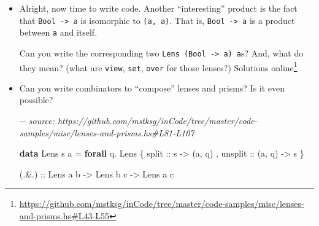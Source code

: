 \documentclass[]{article}
\newenvironment{Shaded}{}{}
\newcommand{\CommentTok}[1]{\textcolor[rgb]{0.38,0.63,0.69}{\textit{#1}}}
\newcommand{\DataTypeTok}[1]{\textcolor[rgb]{0.56,0.13,0.00}{#1}}
\newcommand{\KeywordTok}[1]{\textcolor[rgb]{0.00,0.44,0.13}{\textbf{#1}}}
\newcommand{\NormalTok}[1]{#1}
\newcommand{\OperatorTok}[1]{\textcolor[rgb]{0.40,0.40,0.40}{#1}}
\newcommand{\OtherTok}[1]{\textcolor[rgb]{0.00,0.44,0.13}{#1}}
\renewcommand{\href}[2]{#2\footnote{\url{#1}}}
\begin{document}
\begin{itemize}
\begin{Shaded}
\begin{Highlighting}[]
\CommentTok{{-}{-} source: https://github.com/mstksg/inCode/tree/master/code{-}samples/misc/lenses{-}and{-}prisms.hs\#L59{-}L69}

\OtherTok{mysteryPrism1 ::} \DataTypeTok{Prism\textquotesingle{}}\NormalTok{ (}\DataTypeTok{Bool}\NormalTok{, a) a}

\OtherTok{mysteryPrism2 ::} \DataTypeTok{Prism\textquotesingle{}}\NormalTok{ (}\DataTypeTok{Bool}\NormalTok{, a) a}
\end{Highlighting}
\end{Shaded}

  What do these prisms do? What is \texttt{preview}, \texttt{review},
  \texttt{over} for them?
\item
  Alright, now time to write code. Another ``interesting'' product is the fact
  that \texttt{Bool\ -\textgreater{}\ a} is isomorphic to \texttt{(a,\ a)}. That
  is, \texttt{Bool\ -\textgreater{}\ a} is a product between \texttt{a} and
  itself.

  Can you write the corresponding two
  \texttt{Lens\textquotesingle{}\ (Bool\ -\textgreater{}\ a)\ a}s? And, what do
  they mean? (what are \texttt{view}, \texttt{set}, \texttt{over} for those
  lenses?)
  \href{https://github.com/mstksg/inCode/tree/master/code-samples/misc/lenses-and-prisms.hs\#L43-L55}{Solutions
  online}
\item
  Can you write combinators to ``compose'' lenses and prisms? Is it even
  possible?

\begin{Shaded}
\begin{Highlighting}[]
\CommentTok{{-}{-} source: https://github.com/mstksg/inCode/tree/master/code{-}samples/misc/lenses{-}and{-}prisms.hs\#L81{-}L107}

\KeywordTok{data} \DataTypeTok{Lens\textquotesingle{}}\NormalTok{ s a }\OtherTok{=} \KeywordTok{forall}\NormalTok{ q}\OperatorTok{.} \DataTypeTok{Lens\textquotesingle{}}
\NormalTok{    \{}\OtherTok{ split   ::}\NormalTok{ s }\OtherTok{{-}>}\NormalTok{ (a, q)}
\NormalTok{    ,}\OtherTok{ unsplit ::}\NormalTok{ (a, q) }\OtherTok{{-}>}\NormalTok{ s}
\NormalTok{    \}}

\OtherTok{(.\&.) ::} \DataTypeTok{Lens\textquotesingle{}}\NormalTok{ a b}
      \OtherTok{{-}>} \DataTypeTok{Lens\textquotesingle{}}\NormalTok{ b c}
      \OtherTok{{-}>} \DataTypeTok{Lens\textquotesingle{}}\NormalTok{ a c}


\end{Highlighting}
\end{Shaded}
\end{itemize}
\end{document}
